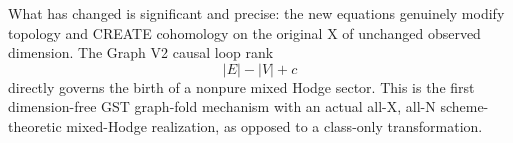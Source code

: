 \documentclass[11pt]{article}
\begin{document}
What has changed is significant and precise:
the new equations genuinely modify
topology and CREATE cohomology on the
original X of unchanged observed dimension.
The Graph V2 causal loop rank
\[
       |E|-|V|+c
\]
directly governs the birth of a nonpure
mixed Hodge sector. This is the first
dimension-free GST graph-fold mechanism
with an actual all-X, all-N
scheme-theoretic mixed-Hodge realization,
as opposed to a class-only transformation.
\end{document}
